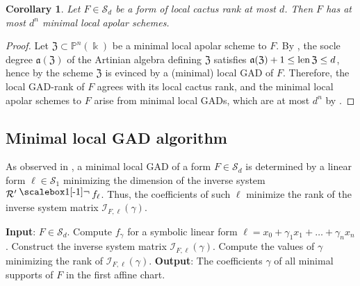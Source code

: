 \documentclass{amsart}
\theoremstyle{plain}
\newtheorem{corollary}[corollary]{Corollary}
\renewcommand{\k}{\Bbbk}
\renewcommand{\S}{\mathcal{S}}
\newcommand{\len}{\textnormal{len}\,}
\renewcommand{\P}{\mathbb{P}}
\def\c{\gamma}
\newcommand{\contract}{\mathbin{\mathpalette\dointprod\relax}}
\newcommand{\dointprod}[2]{%
  \raisebox{\depth}{\scalebox{1}[-1]{$#1\lnot$}}}
\def\P{{\mathbb{P}}}
\def\R{\mathcal{R}}
\def\Z{\mathfrak{Z}}
\numberwithin{equation}{section}
\begin{document}
\begin{corollary} \label{cor:localcactus}
    Let $F \in \S_d$ be a form of local cactus rank at most $d$.
    Then $F$ has at most $d^n$ minimal local apolar schemes.
\end{corollary}
\begin{proof}
    Let $\Z \subset \P^n(\k)$ be a minimal local apolar scheme to $F$.
    By \cite[Prop. 2.11-(iv)]{CI12}, the socle degree $\mathfrak{a}(\Z)$ of the Artinian algebra defining $\Z$ satisfies $\mathfrak{a}(\Z) + 1 \leq \len \Z \leq d$, hence by \cite[Prop. 4.3]{BOT24} the scheme $\Z$ is evinced by a (minimal) local GAD of $F$.
    Therefore, the local GAD-rank of $F$ agrees with its local cactus rank, and the minimal local apolar schemes to $F$ arise from minimal local GADs, which are at most $d^n$ by .
\end{proof}


\subsection{Minimal local GAD algorithm}

As observed in , a minimal local GAD of a form $F\in \S_d$ is determined by a linear form $\ell\in \S_1$ minimizing the dimension of the inverse system $\R' \contract f_{\ell}$.
Thus, the coefficients of such $\ell$ minimize the rank of the inverse system matrix $\mathcal{I}_{F, \ell}(\gamma)$.

\vspace{-0.1cm}
\noindent\begin{minipage}{\linewidth}
\begin{algorithm}[H]
\centering
\caption{\texttt{Minimal local GAD}\label{algo:localgad}}
\begin{algorithmic}[1]
    \State \textbf{Input}: $F \in \S_d$.
    \State Compute $f_{\c}$ for a symbolic linear form $\ell = x_0 + \c_1 x_1 + \dots + \c_nx_n$.
    \State Construct the inverse system matrix $\mathcal{I}_{F,\ell}(\gamma)$.
    \State\label{algo-hard}Compute the values of $\c$ minimizing the rank of $\mathcal{I}_{F,\ell}(\gamma)$.
    \State \textbf{Output}: The coefficients $\c$ of all minimal supports of $F$ in the first affine chart.
\EndFunction
\end{algorithmic}
\end{algorithm}
\end{minipage}
\end{document}
